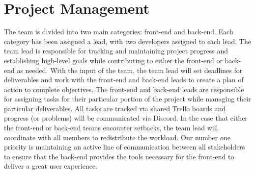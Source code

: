 \section{Project Management}
The team is divided into two main categories: front-end and back-end.  Each category has been assigned a lead, with two developers assigned to each lead.  The team lead is responsible for tracking and maintaining project progress and establishing high-level goals while contributing to either the front-end or back-end as needed.  With the input of the team, the team lead will set deadlines for deliverables and work with the front-end and back-end leads to create a plan of action to complete objectives. The front-end and back-end leads are responsible for assigning tasks for their particular portion of the project while managing their particular deliverables.  All tasks are tracked via shared Trello boards and progress (or problems) will be communicated via Discord.  In the case that either the front-end or back-end teams encounter setbacks, the team lead will coordinate with all members to redistribute the workload.  Our number one priority is maintaining an active line of communication between all stakeholders to ensure that the back-end provides the tools necessary for the front-end to deliver a great user experience.